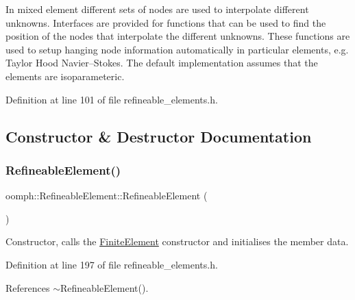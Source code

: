 In mixed element different sets of nodes are used to interpolate different unknowns. Interfaces are provided for functions that can be used to find the position of the nodes that interpolate the different unknowns. These functions are used to setup hanging node information automatically in particular elements, e.\+g. Taylor Hood Navier--Stokes. The default implementation assumes that the elements are isoparameteric. 

Definition at line 101 of file refineable\+\_\+elements.\+h.



\subsection{Constructor \& Destructor Documentation}
\mbox{\label{classoomph_1_1RefineableElement_aaf98d058be56325fc220ca19331fe1c2}} 
\subsubsection{\texorpdfstring{Refineable\+Element()}{RefineableElement()}\hspace{0.1cm}{\footnotesize\ttfamily [1/2]}}
{\footnotesize\ttfamily oomph\+::\+Refineable\+Element\+::\+Refineable\+Element (\begin{DoxyParamCaption}{ }\end{DoxyParamCaption})\hspace{0.3cm}{\ttfamily [inline]}}



Constructor, calls the \hyperlink{classoomph_1_1FiniteElement}{Finite\+Element} constructor and initialises the member data. 



Definition at line 197 of file refineable\+\_\+elements.\+h.



References $\sim$\+Refineable\+Element().

\mbox{\label{classoomph_1_1RefineableElement_ae38105494105430513f05c3cd22b8f48}} 
